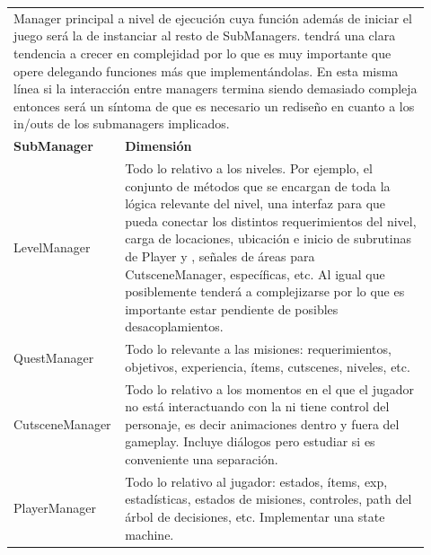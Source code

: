 \pagebreak[4]
\begin{center}
	\color{colortableborder}
	\setlength{\arrayrulewidth}{1pt} 
	\begin{longtable}{|p{0.2\linewidth}|p{0.725\linewidth}|}
		\hline
		\endhead
		\rowcolor{colorthbg}\multicolumn{2}{|l|}{\color{colorthtext}\textbf{GameManager}} \\
		\hline
		\multicolumn{2}{|p{0.961\linewidth}|}{\color{colortextotabla}Manager principal a nivel de ejecución cuya función además de iniciar el juego será la de instanciar al resto de SubManagers. \lsc{GM} tendrá una clara tendencia a crecer en complejidad por lo que es muy importante que opere delegando funciones más que implementándolas. En esta misma línea si la interacción entre managers termina siendo demasiado compleja entonces será un síntoma de que es necesario un rediseño en cuanto a los in/outs de los submanagers implicados.} \\
		\hline
		\rowcolor{colorthbg}\color{colorthtext}\textbf{SubManager} & \color{colorthtext}\textbf{Dimensión} \\
		\hline
		\color{colorthalt}LevelManager & \color{colortextotabla}Todo lo relativo a los niveles. Por ejemplo, el conjunto de métodos que se encargan de toda la lógica relevante del nivel, una interfaz para que \lsc{GM} pueda conectar los distintos requerimientos del nivel, carga de locaciones, ubicación e inicio de subrutinas de Player y \lsc{NPC}, señales de áreas para CutsceneManager, \lsc{UI} específicas, etc. 
		Al igual que \lsc{GM} posiblemente tenderá a complejizarse por lo que es importante estar pendiente de posibles desacoplamientos. \\
		\hline
		\color{colorthalt}QuestManager & \color{colortextotabla}Todo lo relevante a las misiones: requerimientos, objetivos, experiencia, ítems, cutscenes, niveles, etc. \\
		\hline
		\color{colorthalt}Cutscene\newline{}Manager & \color{colortextotabla}Todo lo relativo a los momentos en el que el jugador no está interactuando con la \lsc{UI} ni tiene control del personaje, es decir animaciones dentro y fuera del gameplay. Incluye diálogos pero estudiar si es conveniente una separación. \\
		\hline
		\color{colorthalt}PlayerManager & \color{colortextotabla}Todo lo relativo al jugador: estados, ítems, exp, estadísticas, estados de misiones, controles, path del árbol de decisiones, etc. Implementar una state machine.\\

\end{longtable}
\end{center}
